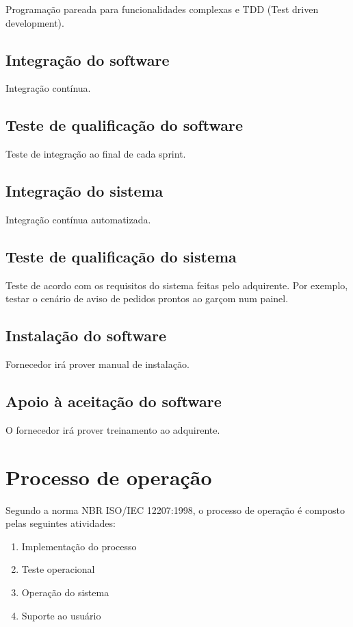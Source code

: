 Programação pareada para funcionalidades complexas e TDD (Test driven development).

\subsection{Integração do software}

Integração contínua.

\subsection{Teste de qualificação do software}

Teste de integração ao final de cada sprint.

\subsection{Integração do sistema}

Integração contínua automatizada.

\subsection{Teste de qualificação do sistema}

Teste de acordo com os requisitos do sistema feitas pelo adquirente. Por exemplo, testar o cenário de aviso de pedidos prontos ao garçom num painel.

\subsection{Instalação do software}

Fornecedor irá prover manual de instalação.

\subsection{Apoio à aceitação do software}

O fornecedor irá prover treinamento ao adquirente.


\section{Processo de operação}
\label{sec:operacao}

Segundo a norma NBR ISO/IEC 12207:1998, o processo de operação é composto pelas seguintes atividades:

\begin{enumerate}
  \item Implementação do processo
  \item Teste operacional
  \item Operação do sistema
  \item Suporte ao usuário
\end{enumerate}

